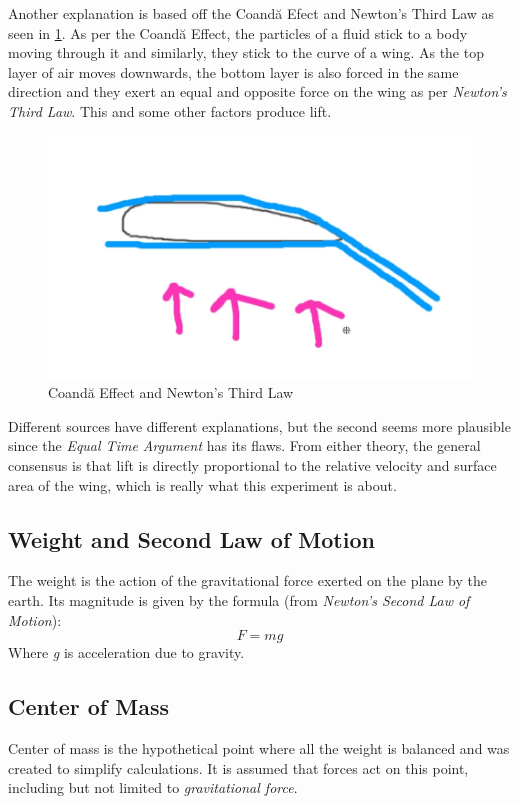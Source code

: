 \documentclass[12pt]{article}
\begin{document}
Another explanation is based off the Coandă Efect and Newton's Third Law as seen in \ref{fig:Coandă Effect}. As per the Coandă Effect, the particles of a fluid stick to a body moving through it and similarly, they stick to the curve of a wing. As the top layer of air moves downwards, the bottom layer is also forced in the same direction and they exert an equal and opposite force on the wing as per \emph{Newton's Third Law}. This and some other factors produce lift.
\newpage
\begin{figure}[h]
\begin{center}
\includegraphics[scale=0.4]{wing}
\end{center}
\caption{Coandă Effect and Newton's Third Law}
\label{fig:Coandă Effect}
\end{figure}
Different sources have different explanations, but the second seems more plausible since the \emph{Equal Time Argument} has its flaws. From either theory, the general consensus is that lift is directly proportional to the relative velocity and surface area of the wing, which is really what this experiment is about.
\subsection{Weight and Second Law of Motion}
The weight is the action of the gravitational force exerted on the plane by the earth. Its magnitude is given by the formula (from \emph{Newton's Second Law of Motion}):
\begin{equation}\label{eq:weight}
F = mg
\end{equation}
Where \emph{g} is acceleration due to gravity.
\subsection{Center of Mass}
Center of mass is the hypothetical point where all the weight is balanced and was created to simplify calculations. It is assumed that forces act on this point, including but not limited to \emph{gravitational force}.
\end{document}
